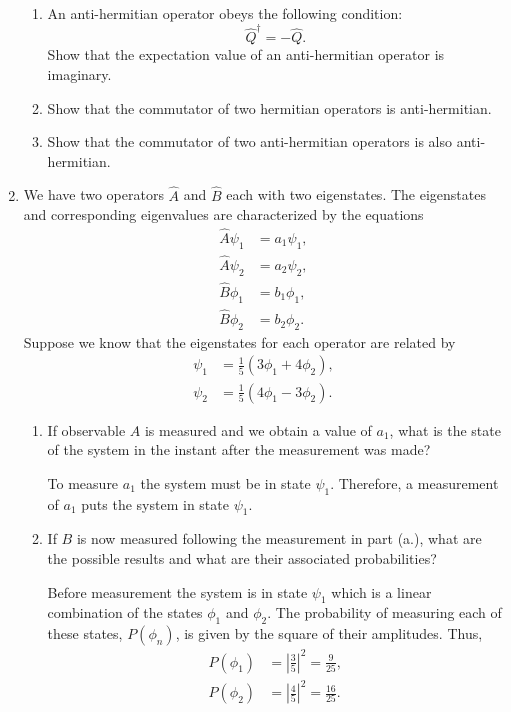 \documentclass[a4paper, 12pt]{config/homework}
\begin{document}
\begin{enumerate}
\begin{enumerate}[label=(\alph*.)]
\item An anti-hermitian operator obeys the following condition:
\[\hat{Q}^\dagger = -\hat{Q}.\]
Show that the expectation value of an anti-hermitian operator is imaginary.



\item Show that the commutator of two hermitian operators is anti-hermitian.



\item Show that the commutator of two anti-hermitian operators is also anti-hermitian.



\end{enumerate}
\pagebreak
\item We have two operators \(\hat{A}\) and \(\hat{B}\) each with two eigenstates. The eigenstates and corresponding eigenvalues are characterized by the equations
\begin{align*}
\hat{A}\psi_1 &= a_1 \psi_1, \\
\hat{A}\psi_2 &= a_2 \psi_2, \\
\hat{B}\phi_1 &= b_1 \phi_1, \\
\hat{B}\phi_2 &= b_2 \phi_2.
\end{align*}
Suppose we know that the eigenstates for each operator are related by
\begin{align*}
\psi_1 &= \frac{1}{5}\left(3\phi_1 + 4\phi_2\right), \\
\psi_2 &= \frac{1}{5}\left(4\phi_1 - 3\phi_2\right).
\end{align*}
\begin{enumerate}[label=(\alph*.)]
\item If observable \(A\) is measured and we obtain a value of \(a_1\), what is the state of the system in the instant after the measurement was made?

To measure \(a_1\) the system must be in state \(\psi_1\). Therefore, a measurement of \(a_1\) puts the system in state \(\psi_1\).

\item If \(B\) is now measured following the measurement in part (a.), what are the possible results and what are their associated probabilities?

Before measurement the system is in state \(\psi_1\) which is a linear combination of the states \(\phi_1\) and \(\phi_2\). The probability of measuring each of these states, \(P(\phi_n)\), is given by the square of their amplitudes. Thus,
\begin{align*}
P(\phi_1) &= \left|\frac{3}{5}\right|^2 = \frac{9}{25}, \\
P(\phi_2) &= \left|\frac{4}{5}\right|^2 = \frac{16}{25}.
\end{align*}


\end{enumerate}
\end{enumerate}
\end{document}
